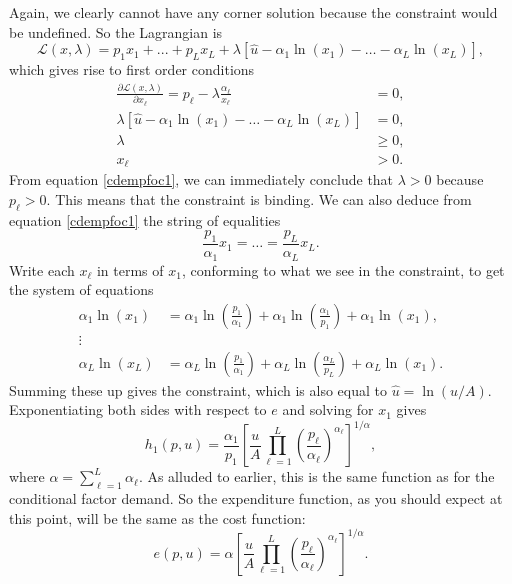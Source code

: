 \documentclass[12pt]{article}
\theoremstyle{definition}
\begin{document}
Again, we clearly cannot have any corner solution because the constraint would be undefined. So the Lagrangian is 
	\[\mathcal{L}(x, \lambda) = p_1x_1 + ... + p_Lx_L + \lambda [\hat{u} - \alpha_1 \ln(x_1) - \hdots - \alpha_L \ln(x_L) ],	\]
which gives rise to first order conditions
\begin{align}
	\frac{\partial \mathcal{L}(x, \lambda)}{\partial x_{\ell}} = p_{\ell} - \lambda \frac{\alpha_{\ell}}{x_{\ell}} &= 0, \label{cdempfoc1}\\
	\lambda [\hat{u} - \alpha_1 \ln(x_1) - \hdots - \alpha_L \ln(x_L) ] &=0,\\
	\lambda &\geq 0,\\
	x_{\ell} &> 0.
\end{align}
From equation \ref{cdempfoc1}, we can immediately conclude that $\lambda >0$ because $p_{\ell} > 0$. This means that the constraint is binding. We can also deduce from equation \ref{cdempfoc1} the string of equalities 
	\[\frac{p_1 }{\alpha_1}x_1 = \hdots = \frac{p_L }{\alpha_L}x_L.	\]
Write each $x_{\ell}$ in terms of $x_1$, conforming to what we see in the constraint, to get the system of equations
\begin{align*}
	\alpha_1\ln(x_1) &= \alpha_1\ln\left(\frac{p_1}{\alpha_1}\right) + \alpha_1\ln \left( \frac{\alpha_1}{p_1}\right) + \alpha_1\ln \left(x_1 \right),\\
	\vdots \\
	\alpha_L\ln(x_L) &= \alpha_L\ln\left(\frac{p_1}{\alpha_1}\right) + \alpha_L\ln \left( \frac{\alpha_L}{p_L}\right) + \alpha_L\ln \left(x_1 \right).
\end{align*}
Summing these up gives the constraint, which is also equal to $\hat{u}=\ln(u/A)$. Exponentiating both sides with respect to $e$ and solving for $x_1$ gives
	\[h_1(p,u) = \frac{\alpha_1}{p_1} \left[ \frac{u}{A} \prod_{\ell=1}^L \left(  \frac{p_{\ell}}{\alpha_{\ell}} \right)^{\alpha_{\ell}} \right]^{1/\alpha},	\]
	where $\alpha = \sum_{\ell=1}^L \alpha_{\ell}$. As alluded to earlier, this is the same function as for the conditional factor demand. So the expenditure function, as you should expect at this point, will be the same as the cost function:
	\[e(p,u) = \alpha \left[ \frac{u}{A} \prod_{\ell=1}^L \left(  \frac{p_{\ell}}{\alpha_{\ell}} \right)^{\alpha_{\ell}} \right]^{1/\alpha}.	\]	



  
\end{document}
